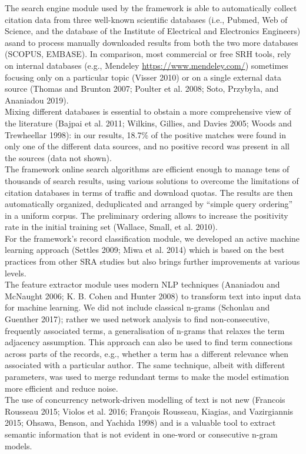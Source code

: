 \documentclass{article}
\begin{document}
The search engine module used by the framework is able to automatically
collect citation data from three well-known scientific databases (i.e.,
Pubmed, Web of Science, and the database of the Institute of Electrical
and Electronics Engineers) asand to process manually downloaded results
from both the two more databases (SCOPUS, EMBASE). In comparison, most
commercial or free SRH tools, rely on internal databases (e.g., Mendeley
\url{https://www.mendeley.com/}) sometimes focusing only on a particular
topic (Visser 2010) or on a single external data source (Thomas and
Brunton 2007; Poulter et al. 2008; Soto, Przybyła, and Ananiadou
2019).\\
Mixing different databases is essential to obstain a more comprehensive
view of the literature (Bajpai et al. 2011; Wilkins, Gillies, and Davies
2005; Woods and Trewheellar 1998): in our results, 18.7\% of the
positive matches were found in only one of the different data sources,
and no positive record was present in all the sources (data not
shown).\\
The framework online search algorithms are efficient enough to manage
tens of thousands of search results, using various solutions to overcome
the limitations of citation databases in terms of traffic and download
quotas. The results are then automatically organized, deduplicated and
arranged by ``simple query ordering'' in a uniform corpus. The
preliminary ordering allows to increase the positivity rate in the
initial training set (Wallace, Small, et al. 2010).\\

For the framework's record classification module, we developed an active
machine learning approach (Settles 2009; Miwa et al. 2014) which is
based on the best practices from other SRA studies but also brings
further improvements at various levels.\\
The feature extractor module uses modern NLP techniques (Ananiadou and
McNaught 2006; K. B. Cohen and Hunter 2008) to transform text into input
data for machine learning. We did not include classical n-grams
(Schonlau and Guenther 2017); rather we used network analysis to find
non-consecutive, frequently associated terms, a generalisation of
n-grams that relaxes the term adjacency assumption. This approach can
also be used to find term connections across parts of the records, e.g.,
whether a term has a different relevance when associated with a
particular author. The same technique, albeit with different parameters,
was used to merge redundant terms to make the model estimation more
efficient and reduce noise.\\
The use of concurrency network-driven modelling of text is not new
(Francois Rousseau 2015; Violos et al. 2016; François Rousseau, Kiagias,
and Vazirgiannis 2015; Ohsawa, Benson, and Yachida 1998) and is a
valuable tool to extract semantic information that is not evident in
one-word or consecutive n-gram models.\\
\end{document}
